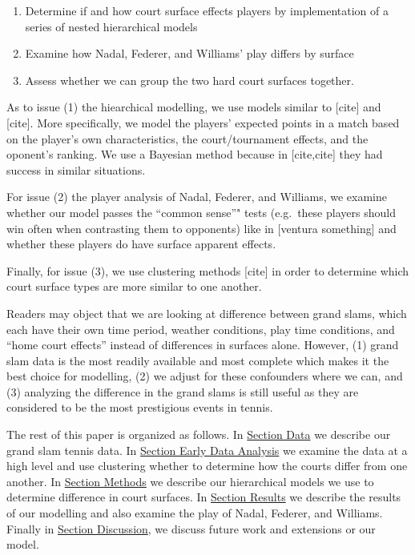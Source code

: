 \documentclass[]{article}
\begin{document}
\begin{enumerate}
\def\labelenumi{\arabic{enumi}.}
\item
  Determine if and how court surface effects players by implementation
  of a series of nested hierarchical models
\item
  Examine how Nadal, Federer, and Williams' play differs by surface
\item
  Assess whether we can group the two hard court surfaces together.
\end{enumerate}

As to issue (1) the hiearchical modelling, we use models similar to
{[}cite{]} and {[}cite{]}. More specifically, we model the players'
expected points in a match based on the player's own characteristics,
the court/tournament effects, and the oponent's ranking. We use a
Bayesian method because in {[}cite,cite{]} they had success in similar
situations.

For issue (2) the player analysis of Nadal, Federer, and Williams, we
examine whether our model passes the ``common sense''" tests (e.g.~these
players should win often when contrasting them to opponents) like in
{[}ventura something{]} and whether these players do have surface
apparent effects.

Finally, for issue (3), we use clustering methods {[}cite{]} in order to
determine which court surface types are more similar to one another.

Readers may object that we are looking at difference between grand
slams, which each have their own time period, weather conditions, play
time conditions, and ``home court effects'' instead of differences in
surfaces alone. However, (1) grand slam data is the most readily
available and most complete which makes it the best choice for
modelling, (2) we adjust for these confounders where we can, and (3)
analyzing the difference in the grand slams is still useful as they are
considered to be the most prestigious events in tennis.

The rest of this paper is organized as follows. In
\protect\hyperlink{sec:data}{Section Data} we describe our grand slam
tennis data. In \protect\hyperlink{sec:eda}{Section Early Data Analysis}
we examine the data at a high level and use clustering whether to
determine how the courts differ from one another. In
\protect\hyperlink{sec:methods}{Section Methods} we describe our
hierarchical models we use to determine difference in court surfaces. In
\protect\hyperlink{sec:results}{Section Results} we describe the results
of our modelling and also examine the play of Nadal, Federer, and
Williams. Finally in \protect\hyperlink{discussion}{Section Discussion},
we discuss future work and extensions or our model.
\end{document}
